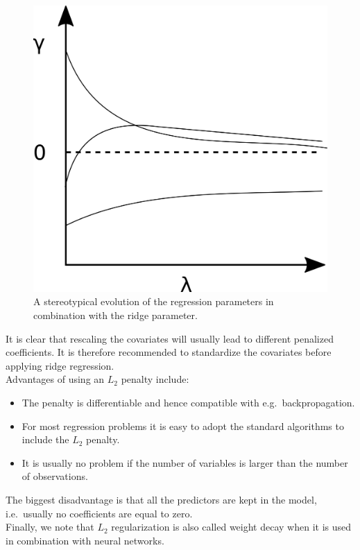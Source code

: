 \begin{figure}[!htb]
\centering
\includegraphics[scale=0.75]{VectorGraphics/ridgeTrace.png}
\caption{\label{fig:RidgeTrace}A stereotypical evolution of the regression parameters in combination with the ridge parameter.}
\end{figure}

It is clear that rescaling the covariates will usually lead to different penalized coefficients. It is therefore recommended to standardize the covariates before applying ridge regression.\\

Advantages of using an $L_2$ penalty include:
\begin{itemize}
\item The penalty is differentiable and hence compatible with e.g.\ backpropagation.
\item For most regression problems it is easy to adopt the standard algorithms to include the $L_2$ penalty.
\item It is usually no problem if the number of variables is larger than the number of observations.
\end{itemize}
The biggest disadvantage is that all the predictors are kept in the model, i.e.\ usually no coefficients are equal to zero. \\

Finally, we note that $L_2$ regularization is also called weight decay when it is used in combination with neural networks. 

